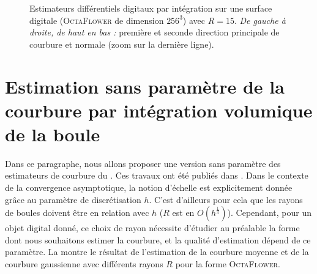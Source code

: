 \begin{figure}[ht]
\begin{center}
\end{center}\vspace{-0.5cm}
  \caption[Estimateurs différentiels digitaux par intégration sur une surface digitale (\textsc{OctaFlower} de dimension $256^3$.]{Estimateurs différentiels digitaux par intégration sur une surface digitale (\textsc{OctaFlower} de dimension $256^3$) avec $R = 15$. \emph{De gauche à droite, de haut en bas :} première et seconde direction principale de courbure et normale (zoom sur la dernière ligne). \label{fig:digital-II-octa-2}}
\end{figure}

\section{Estimation sans paramètre de la courbure par intégration volumique de la boule}
\label{sec:curvature:parameter-free}
%
Dans ce paragraphe, nous allons proposer une version sans paramètre des
estimateurs de courbure du . Ces travaux ont
été publiés dans \cite{DGCI2014}. Dans le contexte de la convergence
asymptotique, la notion d'échelle est explicitement donnée grâce au paramètre de
discrétisation $h$. C'est d'ailleurs pour cela que les rayons de boules doivent
être en relation avec $h$ ($R$ est en $O(h^\frac{1}{3})$). Cependant, pour un
objet digital donné, ce choix de rayon nécessite d'étudier au préalable la forme
dont nous souhaitons estimer la courbure, et la qualité d'estimation dépend de
ce paramètre. La  montre le résultat de
l'estimation de la courbure moyenne et de la courbure gaussienne avec différents
rayons $R$ pour la forme \textsc{OctaFlower}.

